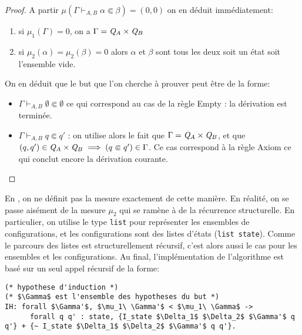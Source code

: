 \begin{proof}
  A partir $\mu(\Gamma \vdash_{A, B} \alpha \Subset \beta) = (0, 0)$ on en déduit immédiatement:
  \begin{enumerate}
  \item si $\mu_1(\Gamma) = 0$, on a $\Gamma = \mathit Q_A \times \mathit Q_B$ 
  \item si $\mu_2(\alpha) = \mu_2(\beta) = 0$ alors $\alpha$ et $\beta$ sont tous les deux soit un état soit l'ensemble vide.
  \end{enumerate}
  On en déduit que le but que l'on cherche à prouver peut être de la forme:
  \begin{itemize}
  \item $\Gamma \vdash_{A, B} \emptyset \Subset \emptyset$ ce qui correspond au cas de la règle Empty : la dérivation est terminée.
  \item $\Gamma \vdash_{A, B} q \Subset q'$ : on utilise alors le fait que
    $\Gamma = \mathit Q_A \times \mathit Q_B$, et que $(q, q') \in \mathit Q_A\times\mathit Q_B \; \Longrightarrow \;
    (q \Subset q') \in \Gamma$. Ce cas correspond à la règle Axiom ce qui conclut encore la dérivation courante.
  \end{itemize}
\end{proof}

En \coq, on ne définit pas la mesure exactement de cette manière. En réalité, on se passe aisément
de la mesure $\mu_2$ qui se ramène à de la récurrence structurelle. 
En particulier, on utilise le type \lstinline!list! pour représenter les ensembles de configurations,
et les configurations sont des listes d'états (\lstinline!list state!). Comme le parcours des listes 
est structurellement récursif, c'est alors aussi le cas pour les ensembles et les configurations.
Au final, l'implémentation de l'algorithme est basé sur un seul appel récursif de la forme:
\begin{lstlisting}
(* hypothese d'induction *)
(* $\Gamma$ est l'ensemble des hypotheses du but *)
IH: forall $\Gamma'$, $\mu_1\ \Gamma'$ < $\mu_1\ \Gamma$ ->
      forall q q' : state, {I_state $\Delta_1$ $\Delta_2$ $\Gamma'$ q q'} + {~ I_state $\Delta_1$ $\Delta_2$ $\Gamma'$ q q'}.
\end{lstlisting}

